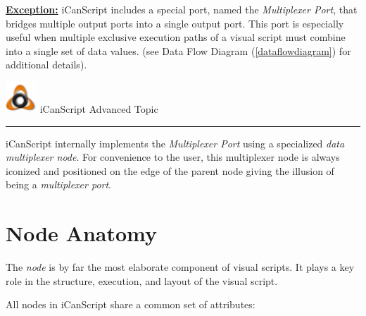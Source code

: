 \underline{\textbf{Exception:}} iCanScript includes a special port, named the \emph{Multiplexer Port}, that bridges multiple output ports into a single output port. This port is especially useful when multiple exclusive execution paths of a visual script must combine into a single set of data values. (see Data Flow Diagram (\autoref{dataflowdiagram}) for additional details).
\begin{tipbox}

\includegraphics[width=33pt,height=33pt]{iCanScriptLogo_32x32x32.png} {\Large \color{black} iCanScript Advanced Topic }

\begin{center}\rule{\textwidth}{0.4pt}\end{center}

iCanScript internally implements the \emph{Multiplexer Port} using a specialized \emph{data multiplexer node}. For convenience to the user, this multiplexer node is always iconized and positioned on the edge of the parent node giving the illusion of being a \emph{multiplexer port}.

\end{tipbox}



\chapter{Node Anatomy}
\label{nodeanatomy}

The \emph{node} is by far the most elaborate component of visual scripts. It plays a key role in the structure, execution, and layout of the visual script.

All nodes in iCanScript share a common set of attributes:

